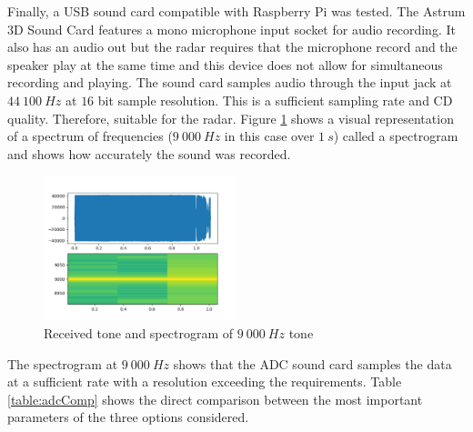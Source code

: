 Finally, a USB sound card compatible with Raspberry Pi was tested. The Astrum 3D Sound Card features a mono microphone input socket for audio recording. It also has an audio out but the radar requires that the microphone record and the speaker play at the same time and this device does not allow for simultaneous recording and playing. The sound card samples audio through the input jack at $44\ 100\ Hz$ at $16$ bit sample resolution. This is a sufficient sampling rate and CD quality. Therefore, suitable for the radar. Figure \ref{fig:9000} shows a visual representation of a spectrum of frequencies ($9\ 000\ Hz$ in this case over $1\ s$) called a spectrogram and shows how accurately the sound was recorded.

\begin{figure}[h!]
    \centering
    \includegraphics[width = 0.5\textwidth]{images/9000.pdf}
    \caption{Received tone and spectrogram of $9\ 000\ Hz$ tone}\label{fig:9000}
\end{figure}

The spectrogram at $9\ 000\ Hz$ shows that the ADC sound card samples the data at a sufficient rate with a resolution exceeding the requirements. Table \ref{table:adcComp} shows the direct comparison between the most important parameters of the three options considered.

